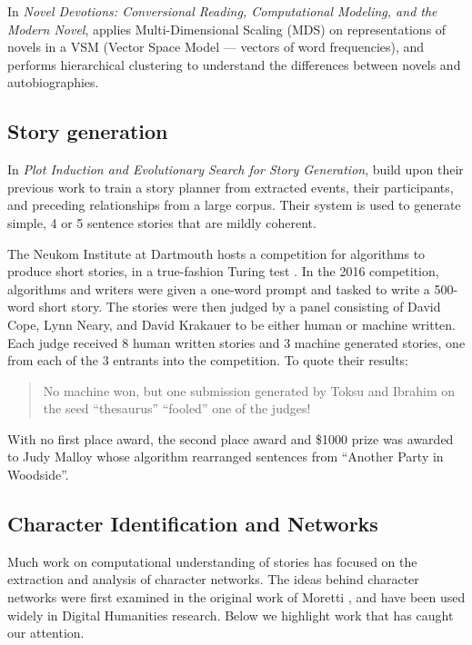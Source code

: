 {In \textit{Novel Devotions: Conversional Reading, Computational Modeling, and the Modern Novel}, \cite{piper2015novel} applies Multi-Dimensional Scaling (MDS) on representations of novels in a VSM (Vector Space Model --- vectors of word frequencies), and performs hierarchical clustering to understand the differences between novels and autobiographies.

\subsection{Story generation}

In \textit{Plot Induction and Evolutionary Search for Story Generation}, \cite{mcintyre2010plot} build upon their previous work to train a story planner from extracted events, their participants, and preceding relationships from a large corpus. Their system is used to generate simple, 4 or 5 sentence stories that are mildly coherent.

The Neukom Institute at Dartmouth hosts a competition for algorithms to produce short stories, in a true-fashion Turing test \citep{digilit2016}.
In the 2016 competition, algorithms and writers were given a one-word prompt and tasked to write a 500-word short story.
The stories were then judged by a panel consisting of David Cope, Lynn Neary, and David Krakauer to be either human or machine written.
Each judge received 8 human written stories and 3 machine generated stories, one from each of the 3 entrants into the competition.
To quote their results:
\begin{quote}
  No machine won, but one submission generated by Toksu and Ibrahim on the seed “thesaurus” “fooled” one of the judges!
\end{quote}
With no first place award, the second place award and \$1000 prize was awarded to Judy Malloy whose algorithm rearranged sentences from ``Another Party in Woodside''.

\subsection{Character Identification and Networks}
\label{subsec:characters}

Much work on computational understanding of stories has focused on the extraction and analysis of character networks.
The ideas behind character networks were first examined in the original work of Moretti \citep{moretti2000conjectures,moretti2007a,schulz2011what,moretti2013distant}, and have been used widely in Digital Humanities research.
Below we highlight work that has caught our attention.

}
